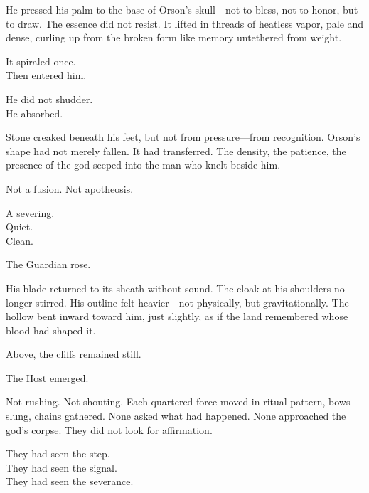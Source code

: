 \documentclass[12pt]{article}
\begin{document}
\vspace{0.5em}
He pressed his palm to the base of Orson’s skull---not to bless, not to honor, but to draw. The essence did not resist. It lifted in threads of heatless vapor, pale and dense, curling up from the broken form like memory untethered from weight.

\vspace{0.5em}
It spiraled once.\\
Then entered him.

\vspace{0.5em}
He did not shudder.\\
He absorbed.

\vspace{0.5em}
Stone creaked beneath his feet, but not from pressure---from recognition. Orson’s shape had not merely fallen. It had transferred. The density, the patience, the presence of the god seeped into the man who knelt beside him.

\vspace{0.5em}
Not a fusion. Not apotheosis.

\vspace{0.5em}
A severing.\\
Quiet.\\
Clean.

\vspace{0.5em}
The Guardian rose.

\vspace{0.5em}
His blade returned to its sheath without sound. The cloak at his shoulders no longer stirred. His outline felt heavier---not physically, but gravitationally. The hollow bent inward toward him, just slightly, as if the land remembered whose blood had shaped it.

\vspace{0.5em}
Above, the cliffs remained still.

\vspace{0.5em}
The Host emerged.

\vspace{0.5em}
Not rushing. Not shouting. Each quartered force moved in ritual pattern, bows slung, chains gathered. None asked what had happened. None approached the god’s corpse. They did not look for affirmation.

\vspace{0.5em}
They had seen the step.\\
They had seen the signal.\\
They had seen the severance.
\end{document}
